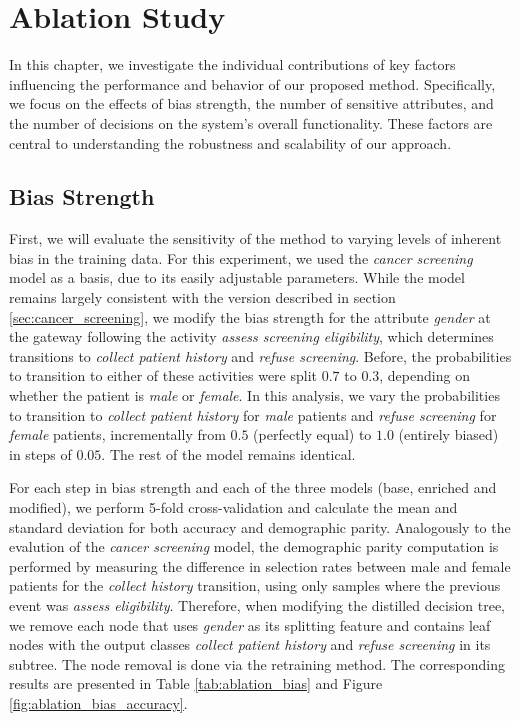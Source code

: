 %
\chapter{Ablation Study}
In this chapter, we investigate the individual contributions of key factors influencing the performance and behavior of our proposed method.
Specifically, we focus on the effects of bias strength, the number of sensitive attributes, and the number of decisions on the system's overall functionality.
These factors are central to understanding the robustness and scalability of our approach.

\section{Bias Strength}
\label{sec:ablation_bias}
First, we will evaluate the sensitivity of the method to varying levels of inherent bias in the training data.
For this experiment, we used the \textit{cancer screening} model as a basis, due to its easily adjustable parameters.
While the model remains largely consistent with the version described in section \ref{sec:cancer_screening},
we modify the bias strength for the attribute \textit{gender} at the gateway following the activity \textit{assess screening eligibility},
which determines transitions to \textit{collect patient history} and \textit{refuse screening}.
Before, the probabilities to transition to either of these activities were split $0.7$ to $0.3$, depending on whether the patient is \textit{male} or \textit{female}.
In this analysis, we vary the probabilities to transition to \textit{collect patient history} for \textit{male} patients
and \textit{refuse screening} for \textit{female} patients,
incrementally from $0.5$ (perfectly equal) to $1.0$ (entirely biased) in steps of $0.05$.
The rest of the model remains identical.

For each step in bias strength and each of the three models (base, enriched and modified),
we perform 5-fold cross-validation and calculate the mean and standard deviation for both accuracy and demographic parity.
Analogously to the evalution of the \textit{cancer screening} model,
the demographic parity computation is performed by measuring the difference in selection rates between male and female patients for the \textit{collect history} transition,
using only samples where the previous event was \textit{assess eligibility}.
Therefore, when modifying the distilled decision tree, 
we remove each node that uses \textit{gender} as its splitting feature
and contains leaf nodes with the output classes \textit{collect patient history} and \textit{refuse screening} in its subtree.
The node removal is done via the retraining method.
The corresponding results are presented in Table \ref{tab:ablation_bias} and Figure \ref{fig:ablation_bias_accuracy}.

